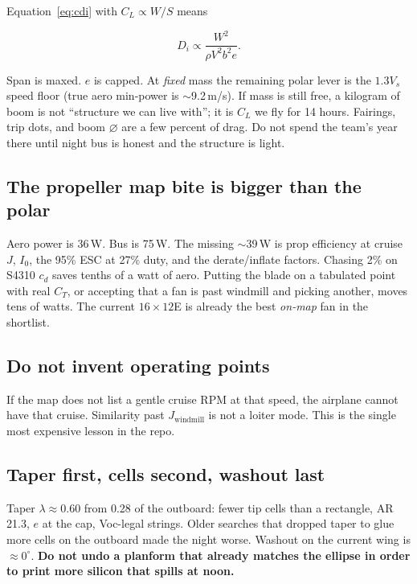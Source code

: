 \documentclass[11pt,letterpaper]{article}
\begin{document}
Equation~\eqref{eq:cdi} with $C_L \propto W/S$ means

\begin{equation}
  D_i \propto \frac{W^2}{\rho V^2 b^2 e}.
\end{equation}

Span is maxed. $e$ is capped. At \emph{fixed} mass the remaining polar lever is the $1.3 V_s$ speed floor (true aero min-power is $\sim$9.2\,m/s). If mass is still free, a kilogram of boom is not ``structure we can live with''; it is $C_L$ we fly for 14 hours. Fairings, trip dots, and boom $\varnothing$ are a few percent of drag. Do not spend the team's year there until night bus is honest and the structure is light.

\subsection{The propeller map bite is bigger than the polar}

Aero power is 36\,W. Bus is 75\,W. The missing $\sim$39\,W is prop efficiency at cruise $J$, $I_0$, the 95\% ESC at 27\% duty, and the derate/inflate factors. Chasing 2\% on S4310 $c_d$ saves tenths of a watt of aero. Putting the blade on a tabulated point with real $C_T$, or accepting that a fan is past windmill and picking another, moves tens of watts. The current $16\times12$E is already the best \emph{on-map} fan in the shortlist.

\subsection{Do not invent operating points}

If the map does not list a gentle cruise RPM at that speed, the airplane cannot have that cruise. Similarity past $J_\mathrm{windmill}$ is not a loiter mode. This is the single most expensive lesson in the repo.

\subsection{Taper first, cells second, washout last}

Taper $\lambda\approx 0.60$ from 0.28 of the outboard: fewer tip cells than a rectangle, AR 21.3, $e$ at the cap, Voc-legal strings. Older searches that dropped taper to glue more cells on the outboard made the night worse. Washout on the current wing is $\approx 0^\circ$. \textbf{Do not undo a planform that already matches the ellipse in order to print more silicon that spills at noon.}
\end{document}

